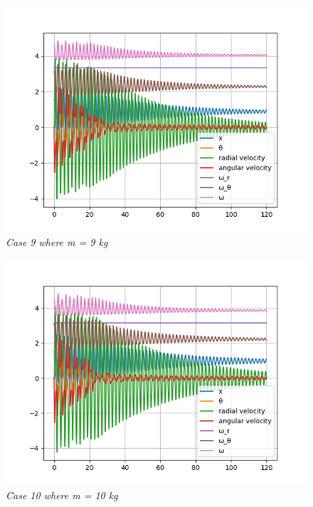 \begin{figure}[H]
    \centering
    \includegraphics[width=15cm]{SimPictures/m9.png}
    \caption{\textit{Case 9 where m = 9 kg}}
    \label{}
\end{figure}
        
\begin{figure}[H]
    \centering
    \includegraphics[width=15cm]{SimPictures/m10.png}
    \caption{\textit{Case 10 where m = 10 kg}}
    \label{}
\end{figure}
        




